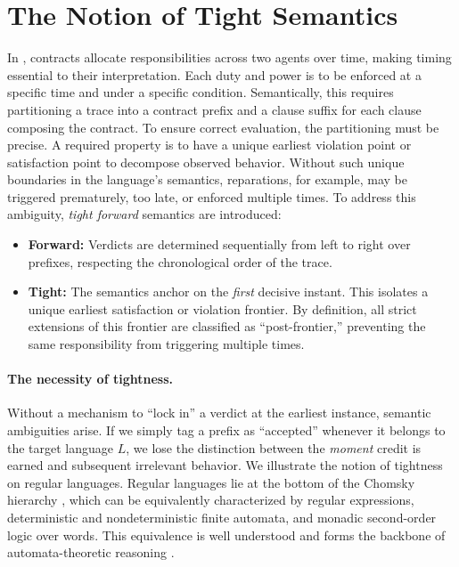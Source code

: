\section{The Notion of Tight Semantics}
\label{sec:motivate-tight}

In \cdl, contracts allocate responsibilities across two agents over time, making timing essential to their interpretation. Each duty and power is to be enforced at a specific time and under a specific condition. Semantically, this requires partitioning a trace into a contract prefix and a clause suffix for each clause composing the contract. To ensure correct evaluation, the partitioning must be precise. A required property is to have a unique earliest violation point or satisfaction point to decompose observed behavior. Without such unique boundaries in the language's semantics, reparations, for example, may be triggered prematurely, too late, or enforced multiple times. To address this ambiguity, \emph{tight forward} semantics are introduced:
\begin{itemize}
    \item \textbf{Forward:} Verdicts are determined sequentially from left to right over prefixes, respecting the chronological order of the trace.
    \item \textbf{Tight:} The semantics anchor on the \emph{first} decisive instant. This isolates a unique earliest satisfaction or violation frontier. By definition, all strict extensions of this frontier are classified as ``post-frontier,'' preventing the same responsibility from triggering multiple times.
\end{itemize}

\paragraph{The necessity of tightness.}
Without a mechanism to ``lock in'' a verdict at the earliest instance, semantic ambiguities arise. If we simply tag a prefix as ``accepted'' whenever it belongs to the target language $L$, we lose the distinction between the \emph{moment} credit is earned and subsequent irrelevant behavior.
We illustrate the notion of tightness on  regular languages. Regular languages lie at the bottom of the Chomsky hierarchy \cite{chomskySchutzenberger1963}, which can be equivalently characterized by regular expressions, deterministic and nondeterministic finite automata, and monadic second-order logic over words. This equivalence is well understood and forms the backbone of automata-theoretic reasoning \cite{Thomas1997}.
